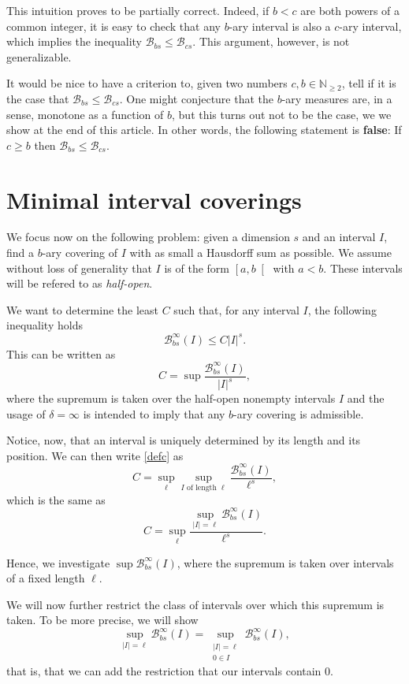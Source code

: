 \documentclass[11pt, reqno]{amsart}
\newcommand{\N}{\mathbb{N}}
\newcommand{\BB}{\mathcal{B}}
\begin{document}
This intuition proves to be partially correct. Indeed, if $b < c$ are both powers of a common integer, it is easy to check that any $b$-ary interval is also a $c$-ary interval, which implies the inequality $\BB_{bs} \leq \BB_{cs}$. This argument, however, is not generalizable.

It would be nice to have a criterion to, given two numbers $c, b \in \N_{\geq 2}$, tell if it is the case that $\BB_{bs} \leq \BB_{cs}$. One might conjecture that the $b$-ary measures are, in a sense, monotone as a function of $b$, but this turns out not to be the case, we we show at the end of this article. In other words, the following statement is \textbf{false}: If $c \geq b$ then $\BB_{bs} \leq \BB_{cs}$.\label{falseconjecture}

\section{Minimal interval coverings}\label{sec5}

We focus now on the following problem: given a dimension $s$ and an interval $I$, find a $b$-ary covering of $I$ with as small a Hausdorff sum as possible. We assume without loss of generality that $I$ is of the form $\left[ a, b \right[$ with $a < b$. These intervals will be refered to as \emph{half-open}.

We want to determine the least  $C$ such that, for any interval $I$, the following inequality holds
$$\BB_{bs}^\infty(I) \leq C \lvert I \rvert^s.$$
 This can be written as
\begin{equation}\label{defc}
C = \sup \frac{\BB_{bs}^\infty(I)}{\lvert I \rvert^s},
\end{equation}
where the supremum is taken over the half-open nonempty intervals $I$ and the usage of $\delta = \infty$ is intended to imply that any $b$-ary covering is admissible.

Notice, now, that an interval is uniquely determined by its length and its position. We can then write \eqref{defc} as
\[C = \sup_\ell \sup_\text{$I$ of length $\ell$} \frac{\BB_{bs}^\infty(I)}{\ell^s},\]
which is the same as
\[C = \sup_\ell \frac{\sup_{\lvert I \rvert = \ell} \BB_{bs}^\infty(I)}{\ell^s}.\]

Hence, we investigate $\sup \BB_{bs}^\infty(I)$, where the supremum is taken over intervals of a fixed length $\ell$.

We will now further restrict the class of intervals over which this supremum is taken. To be more precise, we will show
\[\sup_{\lvert I \rvert = \ell} \BB_{bs}^\infty(I) = \sup_{\substack{\lvert I \rvert = \ell\\ 0 \in I}} \BB_{bs}^\infty(I),\]
that is, that we can add the restriction that our intervals contain 0.
\end{document}

